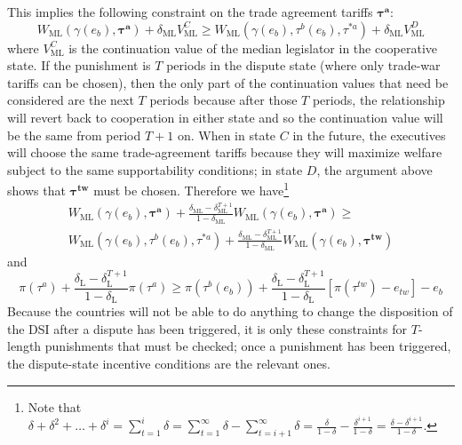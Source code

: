 \documentclass[authoryear, review]{elsarticle}
\newcommand{\bta}{\bm{\tau^a}}
\newcommand{\ga}{\gamma}
\newcommand{\btw}{\bm{\tau^{tw}}}
\newcommand{\de}{\delta}
\begin{document}
This implies the following constraint on the trade agreement tariffs $\bta$:
\[
  W_\text{ML}(\ga(e_b),\bta) + \de_\text{ML} V^C_\text{ML} \geq W_\text{ML}(\ga(e_b),\tau^b(e_b),\tau^{*a}) + \de_\text{ML} V^D_\text{ML}
\]
where $V^C_\text{ML}$ is the continuation value of the median legislator in the cooperative state. If the punishment is $T$ periods in the dispute state (where only trade-war tariffs can be chosen), then the only part of the continuation values that need be considered are the next $T$ periods because after those $T$ periods, the relationship will revert back to cooperation in either state and so the continuation value will be the same from period $T+1$ on. When in state $C$ in the future, the executives will choose the same trade-agreement tariffs because they will maximize welfare subject to the  same supportability conditions; in state $D$, the argument above shows that $\btw$ must be chosen. Therefore we have\footnote{Note that $\de + \de^2 + \ldots + \de^i = \sum_{t=1}^i \de= \sum_{t=1}^\infty \de - \sum_{t=i+1}^\infty \de = \frac{\de}{1-\de} - \frac{\de^{i+1}}{1-\de} = \frac{\de - \de^{i+1}}{1-\de} $.}
\begin{multline}
  W_\text{ML}(\ga(e_b),\bta) + \frac{\de_\text{ML} - \de_\text{ML}^{T+1}}{1-\de_\text{ML}} W_\text{ML}(\ga(e_b),\bta) \geq \\
	W_\text{ML}(\ga(e_b),\tau^b(e_b),\tau^{*a}) + \frac{\de_\text{ML} - \de_\text{ML}^{T+1}}{1-\de_\text{ML}} W_\text{ML}(\ga(e_b),\btw)
  \label{ine:leg}
\end{multline}
and
\begin{equation}
  \pi(\tau^a) + \frac{\de_\text{L} - \de_\text{L}^{T+1}}{1-\de_\text{L}} \pi(\tau^a) \geq \pi(\tau^b(e_b)) + \frac{\de_\text{L} - \de_\text{L}^{T+1}}{1-\de_\text{L}} \left[\pi(\tau^{tw}) - e_{tw} \right] - e_b
  \label{ine:lob}
\end{equation}
Because the countries will not be able to do anything to change the disposition of the DSI after a dispute has been triggered, it is only these constraints for $T$-length punishments that must be checked; once a punishment has been triggered, the dispute-state incentive conditions are the relevant ones.
\end{document}
